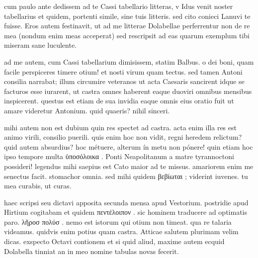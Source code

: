 


 cum paulo ante dedissem ad te Cassi tabellario litteras, v Idus venit noster tabellarius et quidem, portenti simile, sine tuis litteris. sed cito conieci Lanuvi te fuisse. Eros autem festinavit, ut ad me litterae Dolabellae perferrentur non de re mea (nondum enim meas acceperat) sed rescripsit ad eas quarum exemplum tibi miseram sane luculente.

 ad me autem, cum Cassi tabellarium dimisissem, statim Balbus. o dei boni, quam facile perspiceres timere otium! et nosti virum quam tectus. sed tamen Antoni consilia narrabat; illum circumire veteranos ut acta Caesaris sancirent idque se facturos esse iurarent, ut castra omnes haberent eaque duoviri omnibus mensibus inspicerent. questus est etiam de sua invidia eaque omnis eius oratio fuit ut amare videretur Antonium. quid quaeris? nihil sinceri.

 mihi autem non est dubium quin res spectet ad castra. acta enim illa res est animo virili, consilio puerili. quis enim hoc non vidit, regni heredem relictum? quid autem absurdius? hoc métuere, alterum ín metu non pónere! quin etiam hoc ipso tempore multa ὑποσόλοικα . Ponti Neapolitanum a matre tyrannoctoni possideri! legendus mihi saepius est Cato maior ad te missus. amariorem enim me senectus facit. stomachor omnia. sed mihi quidem βεβίωται ; viderint iuvenes. tu mea curabis, ut curas.

 haec scripsi seu dictavi apposita secunda mensa apud Vestorium. postridie apud Hirtium cogitabam et quidem πεντέλοιπον . sic hominem traducere ad optimatis paro. λῆροσ πολύσ . nemo est istorum qui otium non timeat. qua re talaria videamus. quidvis enim potius quam castra. Atticae salutem plurimam velim dicas. exspecto Octavi contionem et si quid aliud, maxime autem ecquid Dolabella tinniat an in meo nomine tabulas novas fecerit.
